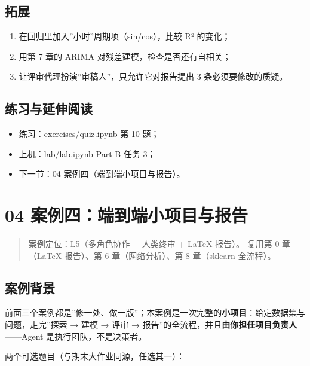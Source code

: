 \subsection{拓展}\label{ux62d3ux5c55-13}

\begin{enumerate}
\def\labelenumi{\arabic{enumi}.}
\tightlist
\item
  在回归里加入''小时''周期项（sin/cos），比较 R² 的变化；
\item
  用第 7 章的 ARIMA 对残差建模，检查是否还有自相关；
\item
  让评审代理扮演''审稿人''，只允许它对报告提出 3 条必须要修改的质疑。
\end{enumerate}

\subsection{练习与延伸阅读}\label{ux7ec3ux4e60ux4e0eux5ef6ux4f38ux9605ux8bfb-5}

\begin{itemize}
\tightlist
\item
  练习：exercises/quiz.ipynb 第 10 题；
\item
  上机：lab/lab.ipynb Part B 任务 3；
\item
  下一节：04 案例四（端到端小项目与报告）。
\end{itemize}

\section{04
案例四：端到端小项目与报告}\label{ux6848ux4f8bux56dbux7aefux5230ux7aefux5c0fux9879ux76eeux4e0eux62a5ux544a}

\begin{quote}
案例定位：L5（多角色协作 + 人类终审 + LaTeX 报告）。 复用第 0 章（LaTeX
报告）、第 6 章（网络分析）、第 8 章（sklearn 全流程）。
\end{quote}

\subsection{案例背景}\label{ux6848ux4f8bux80ccux666f-7}

前面三个案例都是''修一处、做一版''；本案例是一次完整的\textbf{小项目}：给定数据集与问题，走完''探索
→ 建模 → 评审 →
报告''的全流程，并且\textbf{由你担任项目负责人}------Agent
是执行团队，不是决策者。

两个可选题目（与期末大作业同源，任选其一）：


